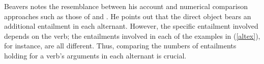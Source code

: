 \documentclass[output=paper,biblatex,babelshorthands,newtxmath,draftmode,colorlinks, citecolor=brown]{langscibook}
\begin{document}
Beavers notes the resemblance between his account and numerical comparison approaches such as those of \citet{Dowty1991} and \citet{AckermanandMoore2001}.
He points out that the direct object bears an additional entailment in each alternant. However, the specific entailment involved depends on the verb; the entailments involved in each of the examples in (\ref{altex}), for instance, are all different.  Thus, comparing the numbers of entailments holding for a verb's arguments in each alternant is crucial.

\end{document}
